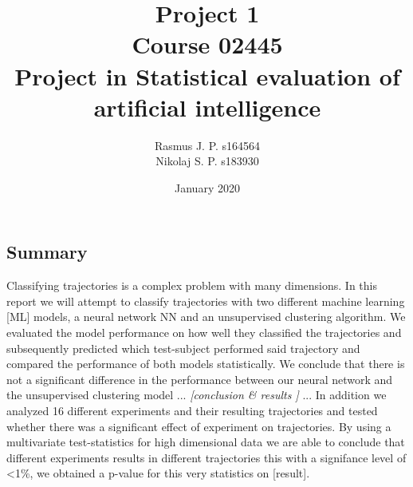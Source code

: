 \documentclass{article}
\begin{document}
\begin{titlepage}
	
	
	\title{Project 1 \\ Course 02445 \\ Project in Statistical evaluation of \\ artificial intelligence }
	\author{Rasmus J. P. s164564 \\ Nikolaj S. P. s183930}
	\date{January 2020}
	\maketitle
	
\subsection*{Summary}
Classifying trajectories is a complex problem with many dimensions. In this report we will attempt to classify trajectories with two different machine learning [ML] models, a neural network NN and an unsupervised clustering algorithm. We evaluated the model performance on how well they classified the trajectories and subsequently predicted which test-subject performed said trajectory and compared the performance of both models statistically. We conclude that there is not a significant difference in the performance between our neural network and the unsupervised clustering model  ... \textit{[conclusion \& results ]} ... In addition we analyzed 16 different experiments and their resulting trajectories and tested whether there was a significant effect of experiment on trajectories.  By using a multivariate test-statistics for high dimensional data we are able to conclude that different experiments results in different trajectories this with a signifance level of <1\%, we obtained a p-value for this very statistics on [result].

\end{titlepage}
\end{document}
